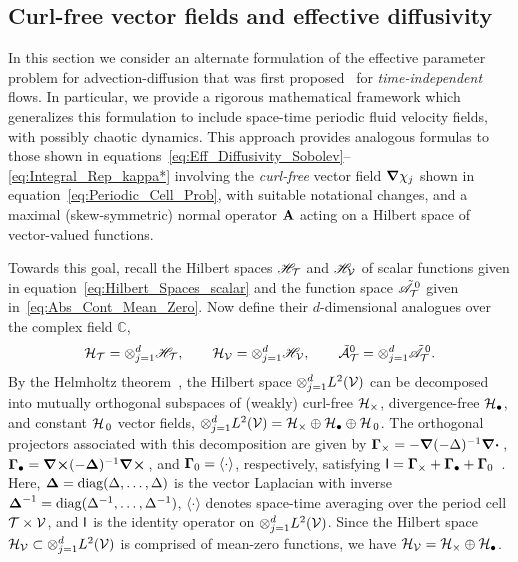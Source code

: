 \documentclass[amsa]{ipart}
\begin{document}
\subsection{Curl-free vector fields and effective diffusivity}
\label{app:Curl_Free_Fields}
%
In this section we consider an alternate formulation of the effective
parameter problem for advection-diffusion that was first
proposed~\cite{Avellaneda:PRL-753,Avellaneda:CMP-339} for
\emph{time-independent} flows. In particular, we provide a rigorous
mathematical framework 
which generalizes this formulation to include space-time periodic fluid
velocity fields, with possibly chaotic dynamics.  This approach
provides analogous formulas to those shown in
equations~\eqref{eq:Eff_Diffusivity_Sobolev}--\eqref{eq:Integral_Rep_kappa*}
involving the \emph{curl-free} vector field $\mbox{\boldmath${\nabla}$}\chi_j$ shown in 
equation~\eqref{eq:Periodic_Cell_Prob}, with suitable notational
changes, and a maximal (skew-symmetric) 
normal operator $\mathbf{A}$ acting on a Hilbert space of vector-valued
functions.   







Towards this goal, recall the Hilbert spaces $\mathscr{H}_{\mathcal{T}}$ and
$\mathscr{H}_{\mathcal{V}}$ of scalar functions given in
equation~\eqref{eq:Hilbert_Spaces_scalar} and the function space 
$\tilde{\mathscr{A}}^{\,0}_{\mathcal{T}}$ given in~\eqref{eq:Abs_Cont_Mean_Zero}.
Now define
their $d$-dimensional analogues over the complex field $\mathbb{C}$,  
%
\begin{align}\label{eq:Hilbert_Spaces_vector}
  \Hc_{\Tc}=\otimes_{j=1}^d\Hs_{\Tc}, \qquad
  \Hc_{\Vc}=\otimes_{j=1}^d\Hs_{\Vc}, \qquad
  \tilde{\Ac}^0_{\Tc}=\otimes_{j=1}^d\tilde{\As}^{\,0}_{\Tc}.
\end{align}
%
By the Helmholtz
theorem~\cite{Denaro:2003:0271,Bhatia:IEE:1077,Fannjiang:1994:SIAM_JAM:333},
the 
Hilbert space $\otimes_{j=1}^dL^2(\mathcal{V})$ can be decomposed into mutually
orthogonal subspaces of (weakly) curl-free $\mathcal{H}_\times$, divergence-free
$\mathcal{H}_\bullet$, and constant $\mathcal{H}_{\,0}$ vector fields,
$\otimes_{j=1}^dL^2(\mathcal{V})=\mathcal{H}_\times\oplus\mathcal{H}_\bullet\oplus\mathcal{H}_{\,0}$. The orthogonal projectors
associated with this decomposition are given by
$\mbox{\boldmath${\Gamma}$}_\times=-\mbox{\boldmath${\nabla}$}(-\Delta)^{-1}\mbox{\boldmath${\nabla}$} \mbox{\boldmath${\cdot}$}\,$,
$\mbox{\boldmath${\Gamma}$}_\bullet=\mbox{\boldmath${\nabla}$}\mbox{\boldmath${\times}$}(-\mbox{\boldmath${\Delta}$})^{-1}\mbox{\boldmath${\nabla}$} \mbox{\boldmath${\times}$}\,$, and 
$\mbox{\boldmath${\Gamma}$}_0=\langle\cdot\rangle$,  respectively, satisfying
$\mathsf{I}=\mbox{\boldmath${\Gamma}$}_\times+\mbox{\boldmath${\Gamma}$}_\bullet+\mbox{\boldmath${\Gamma}$}_0$~\cite{Fannjiang:1994:SIAM_JAM:333,Novikov:2005:CPAM:867,Milton:2002:TC}. Here, 
$\mbox{\boldmath${\Delta}$}=\text{diag}(\Delta,\ldots,\Delta)$ is the vector Laplacian with inverse
$\mbox{\boldmath${\Delta}$}^{-1}=\text{diag}(\Delta^{-1},\ldots,\Delta^{-1})$, $\langle\cdot\rangle$ denotes space-time
averaging over the period cell $\mathcal{T}\times\mathcal{V}$, and $\mathsf{I}$ is the identity
operator on $\otimes_{j=1}^dL^2(\mathcal{V})$. Since the Hilbert space
$\mathcal{H}_{\mathcal{V}}\subset\otimes_{j=1}^dL^2(\mathcal{V})$ is comprised of mean-zero functions, we have
$\mathcal{H}_{\mathcal{V}}=\mathcal{H}_\times\oplus\mathcal{H}_\bullet$. 
\end{document}
